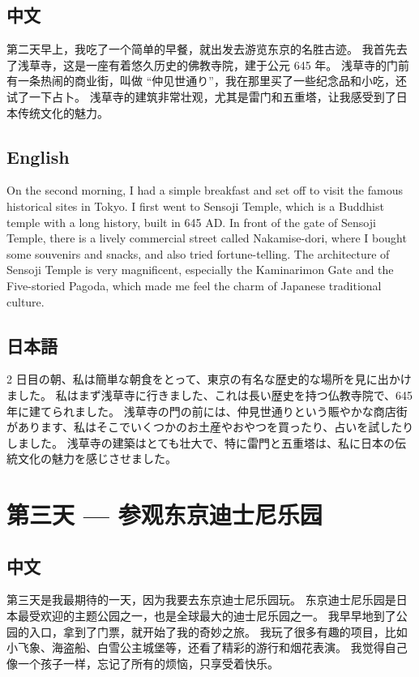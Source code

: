 \documentclass{kspaper}
\begin{document}
\subsection{中文}

第二天早上，我吃了一个简单的早餐，就出发去游览东京的名胜古迹。
我首先去了浅草寺，这是一座有着悠久历史的佛教寺院，建于公元 645 年。
浅草寺的门前有一条热闹的商业街，叫做 ``仲见世通り''，我在那里买了一些纪念品和小吃，还试了一下占卜。
浅草寺的建筑非常壮观，尤其是雷门和五重塔，让我感受到了日本传统文化的魅力。

\subsection{English}

On the second morning, I had a simple breakfast and set off to visit the famous historical sites in Tokyo.
I first went to Sensoji Temple, which is a Buddhist temple with a long history, built in 645 AD.
In front of the gate of Sensoji Temple, there is a lively commercial street called Nakamise-dori,
where I bought some souvenirs and snacks, and also tried fortune-telling.
The architecture of Sensoji Temple is very magnificent, especially the Kaminarimon Gate and the Five-storied Pagoda,
which made me feel the charm of Japanese traditional culture.

\subsection{日本語}

2 日目の朝、私は簡単な朝食をとって、東京の有名な歴史的な場所を見に出かけました。
私はまず浅草寺に行きました、これは長い歴史を持つ仏教寺院で、645 年に建てられました。
浅草寺の門の前には、仲見世通りという賑やかな商店街があります、私はそこでいくつかのお土産やおやつを買ったり、占いを試したりしました。
浅草寺の建築はとても壮大で、特に雷門と五重塔は、私に日本の伝統文化の魅力を感じさせました。

\section{第三天 --- 参观东京迪士尼乐园}

\subsection{中文}

第三天是我最期待的一天，因为我要去东京迪士尼乐园玩。
东京迪士尼乐园是日本最受欢迎的主题公园之一，也是全球最大的迪士尼乐园之一。
我早早地到了公园的入口，拿到了门票，就开始了我的奇妙之旅。
我玩了很多有趣的项目，比如小飞象、海盗船、白雪公主城堡等，还看了精彩的游行和烟花表演。
我觉得自己像一个孩子一样，忘记了所有的烦恼，只享受着快乐。
\end{document}
